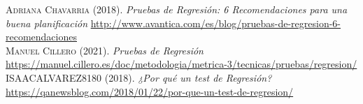 \documentclass[conference]{IEEEtran}
\begin{document}
\begin{thebibliography}{}
 \textsc{Adriana Chavarria} (2018). \textit{Pruebas de Regresión: 6 Recomendaciones para una buena planificación} \url{http://www.avantica.com/es/blog/pruebas-de-regresion-6-recomendaciones} \\

\bibitem{} \textsc{Manuel Cillero} (2021). \textit{Pruebas de Regresión} \url{https://manuel.cillero.es/doc/metodologia/metrica-3/tecnicas/pruebas/regresion/} \\

 \textsc{ISAACALVAREZ8180} (2018). \textit{¿Por qué un test de Regresión?} \url{https://qanewsblog.com/2018/01/22/por-que-un-test-de-regresion/} \\




\end{thebibliography}
\end{document}

